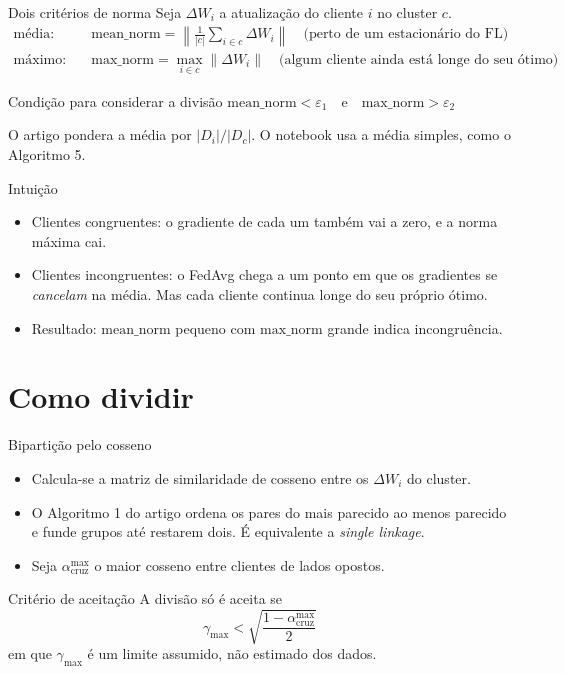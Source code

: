 \documentclass[aspectratio=169]{beamer}
\begin{document}
\begin{frame}{Dois critérios de norma}
  Seja $\Delta W_i$ a atualização do cliente $i$ no cluster $c$.
  \begin{align*}
    \text{média:}\quad & \mathrm{mean\_norm} = \left\| \frac{1}{|c|} \sum_{i \in c} \Delta W_i \right\|
      \quad \text{(perto de um estacionário do FL)}\\[0.6em]
    \text{máximo:}\quad & \mathrm{max\_norm} = \max_{i \in c} \| \Delta W_i \|
      \quad \text{(algum cliente ainda está longe do seu ótimo)}
  \end{align*}
  \vspace{0.4em}
  \begin{block}{Condição para considerar a divisão}
    $\mathrm{mean\_norm} < \varepsilon_1 \quad \text{e} \quad \mathrm{max\_norm} > \varepsilon_2$
  \end{block}
  \small O artigo pondera a média por $|D_i|/|D_c|$. O notebook usa a média simples, como o Algoritmo 5.
\end{frame}

\begin{frame}{Intuição}
  \begin{itemize}
    \item Clientes congruentes: o gradiente de cada um também vai a zero, e a norma máxima cai.
    \item Clientes incongruentes: o FedAvg chega a um ponto em que os gradientes se
      \emph{cancelam} na média. Mas cada cliente continua longe do seu próprio ótimo.
    \item Resultado: $\mathrm{mean\_norm}$ pequeno com $\mathrm{max\_norm}$ grande indica
      incongruência.
  \end{itemize}
\end{frame}

\section{Como dividir}

\begin{frame}{Bipartição pelo cosseno}
  \begin{itemize}
    \item Calcula-se a matriz de similaridade de cosseno entre os $\Delta W_i$ do cluster.
    \item O Algoritmo 1 do artigo ordena os pares do mais parecido ao menos parecido e
      funde grupos até restarem dois. É equivalente a \emph{single linkage}.
    \item Seja $\alpha^{\max}_{\text{cruz}}$ o maior cosseno entre clientes de lados opostos.
  \end{itemize}
  \vspace{0.6em}
  \begin{block}{Critério de aceitação}
    A divisão só é aceita se
    \[
      \gamma_{\max} < \sqrt{\frac{1 - \alpha^{\max}_{\text{cruz}}}{2}}
    \]
    em que $\gamma_{\max}$ é um limite assumido, não estimado dos dados.
  \end{block}
\end{frame}
\end{document}
